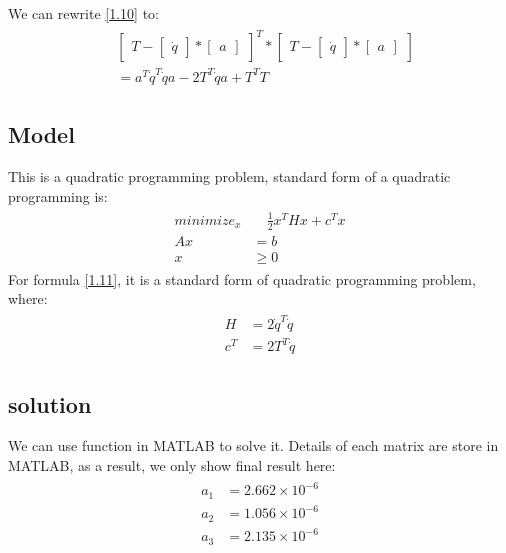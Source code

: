\documentclass{article}
\begin{document}
        We can rewrite \eqref{1.10} to:
        \begin{align}
        \begin{split}\label{1.11}
            &\begin{bmatrix}T - \begin{bmatrix} \dot{q} \end{bmatrix} * \begin{bmatrix} a \end{bmatrix} \end{bmatrix}^T * 
            \begin{bmatrix}T - \begin{bmatrix} \dot{q} \end{bmatrix} * \begin{bmatrix} a \end{bmatrix} \end{bmatrix}\\
            &= a^T \dot{q}^T \dot{q} a - 2T^T\dot{q}a + T^TT
        \end{split}
        \end{align}
        
    \subsection{Model}
        This is a quadratic programming problem, standard form of a quadratic programming is:
        \begin{align}
        \begin{split}
            minimize_x &\quad \frac 12x^THx + c^Tx\\
            Ax &= b\\
            x &\geq 0
        \end{split}
        \end{align} 
        For formula \eqref{1.11}, it is a standard form of quadratic programming problem, where:
        \begin{align}
        \begin{split}\label{1.11}
            H &= 2 \dot{q}^T \dot{q}\\
            c^T &= 2T^T\dot{q}
        \end{split}
        \end{align} 
        
    \subsection{solution}    
        We can use function in MATLAB to solve it. Details of each matrix are store in MATLAB, as a result, we only show final result here:
        \begin{align}
        \begin{split}
           a_1 &= 2.662\times10^{-6}\\
           a_2 &= 1.056\times10^{-6}\\
           a_3 &= 2.135\times10^{-6}      
        \end{split}
        \end{align}     
        
\end{document}
